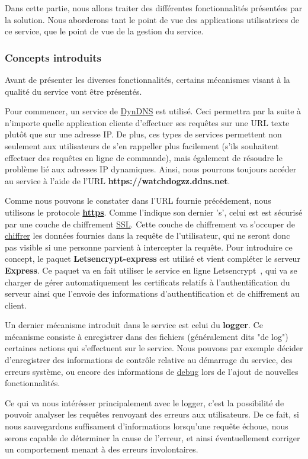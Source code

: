 Dans cette partie, nous allons traiter des différentes fonctionnalités présentées par la solution. Nous aborderons tant le point de vue des applications utilisatrices de ce service, que le point de vue de la gestion du service.

\subsubsection{Concepts introduits}

Avant de présenter les diverses fonctionnalités, certains mécanismes visant à la qualité du service vont être présentés.

Pour commencer, un service de \underline{DynDNS} est utilisé. Ceci permettra par la suite à n'importe quelle application cliente d'effectuer ses requêtes sur une URL texte plutôt que sur une adresse IP. De plus, ces types de services permettent non seulement aux utilisateurs de s'en rappeller plus facilement (s'ils souhaitent effectuer des requêtes en ligne de commande), mais également de résoudre le problème lié aux adresses IP dynamiques. Ainsi, nous pourrons toujours accéder au service à l'aide de l'URL \textbf{https://watchdogzz.ddns.net}.

Comme nous pouvons le constater dans l'URL fournie précédement, nous utilisons le protocole \textbf{\underline{https}}. Comme l'indique son dernier 's', celui est est sécurisé par une couche de chiffrement \underline{SSL}. Cette couche de chiffrement va s'occuper de \underline{chiffrer} les données fournies dans la requête de l'utilisateur, qui ne seront donc pas visible si une personne parvient à intercepter la requête.
Pour introduire ce concept, le paquet \textbf{Letsencrypt-express} est utilisé et vient compléter le serveur \textbf{Express}. Ce paquet va en fait utiliser le service en ligne Letsencrypt~\cite{letsencrypt}, qui va se charger de gérer automatiquement les certificats relatifs à l'authentification du serveur ainsi que l'envoie des informations d'authentification et de chiffrement au client.

Un dernier mécanisme introduit dans le service est celui du \textbf{logger}. Ce mécanisme consiste à enregistrer dans des fichiers (généralement dits "de log") certaines actions qui s'effectuent sur le service. Nous pouvons par exemple décider d'enregistrer des informations de contrôle relative au démarrage du service, des erreurs système, ou encore des informations de \underline{debug} lors de l'ajout de nouvelles fonctionnalités.

Ce qui va nous intérésser principalement avec le logger, c'est la possibilité de pouvoir analyser les requêtes renvoyant des erreurs aux utilisateurs.
De ce fait, si nous sauvegardons suffisament d'informations lorsqu'une requête échoue, nous serons capable de déterminer la cause de l'erreur, et ainsi éventuellement corriger un comportement menant à des erreurs involontaires.

